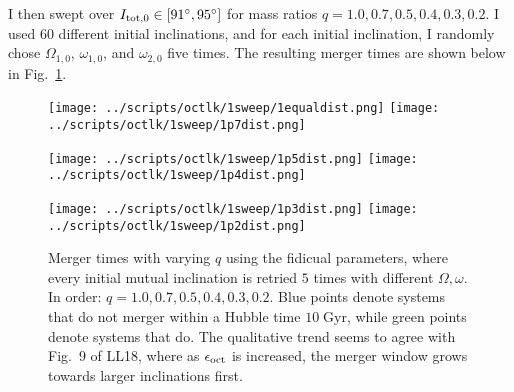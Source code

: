 \documentclass[11pt,
        usenames, %
        dvipsnames %
    ]{article}
\begin{document}
I then swept over $I_{\rm tot, 0} \in [91^\circ, 95^\circ]$ for mass ratios $q =
1.0, 0.7, 0.5, 0.4, 0.3, 0.2$. I used 60 different initial inclinations, and for
each initial inclination, I randomly chose $\Omega_{1, 0}$, $\omega_{1, 0}$, and
$\omega_{2, 0}$ five times. The resulting merger times are shown below in
Fig.~\ref{fig:sweep}.
\begin{figure*}
    \centering
    \texttt{[image: ../scripts/octlk/1sweep/1equaldist.png]}
    \texttt{[image: ../scripts/octlk/1sweep/1p7dist.png]}

    \texttt{[image: ../scripts/octlk/1sweep/1p5dist.png]}
    \texttt{[image: ../scripts/octlk/1sweep/1p4dist.png]}

    \texttt{[image: ../scripts/octlk/1sweep/1p3dist.png]}
    \texttt{[image: ../scripts/octlk/1sweep/1p2dist.png]}
    \caption{Merger times with varying $q$ using the fidicual parameters, where
    every initial mutual inclination is retried $5$ times with different
    $\Omega, \omega$. In order: $q = 1.0, 0.7, 0.5, 0.4, 0.3, 0.2$. Blue points
    denote systems that do not merger within a Hubble time $10\;\mathrm{Gyr}$,
    while green points denote systems that do. The qualitative trend seems to
    agree with Fig.~9 of LL18, where as $\epsilon_{\rm oct}$ is increased, the
    merger window grows towards larger inclinations first.}\label{fig:sweep}
\end{figure*}
\end{document}
